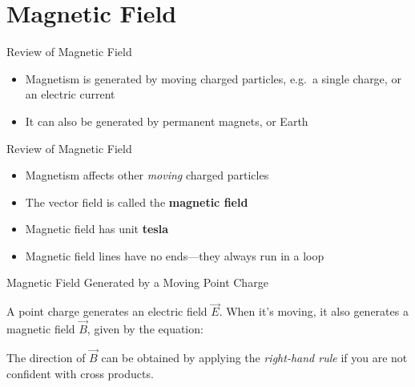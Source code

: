 \documentclass[12pt,aspectratio=169]{beamer}
\begin{document}
\section{Magnetic Field}

\begin{frame}{Review of Magnetic Field}
  \begin{itemize}
  \item Magnetism is generated by moving charged particles, e.g.\ a single
    charge, or an electric current
  \item It can also be generated by permanent magnets, or Earth
  \end{itemize}
\end{frame}



\begin{frame}{Review of Magnetic Field}
  \begin{itemize}
  \item Magnetism affects other \emph{moving} charged particles
  \item The vector field is called the \textbf{magnetic field}
  \item Magnetic field has unit \textbf{tesla}
  \item Magnetic field lines have no ends---they always run in a loop
  \end{itemize}
\end{frame}



\begin{frame}{Magnetic Field Generated by a Moving Point Charge}
  \begin{center}
  \end{center}
  A point charge generates an electric field $\vec E$. When it's moving, it
  also generates a magnetic field $\vec B$, given by the equation:


  The direction of $\vec B$ can be obtained by applying the
  \emph{right-hand rule} if you are not confident with cross products.
\end{frame}
\end{document}
